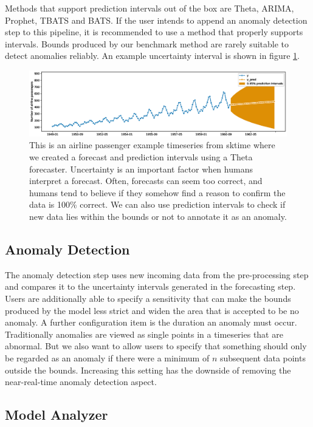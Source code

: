 Methods that support prediction intervals out of the box are Theta, ARIMA, Prophet, TBATS and BATS. If the user intends to append an anomaly detection step to this pipeline, it is recommended to use a method that properly supports intervals. Bounds produced by our benchmark method are rarely suitable to detect anomalies reliably. An example uncertainty interval is shown in figure \ref{fig:uncertainty}.


\begin{figure}
\centerline{\includegraphics[scale=.5]{Figures/uncertainty.eps}}
\caption{This is an airline passenger example timeseries from sktime where we created a forecast and prediction intervals using a Theta forecaster. Uncertainty is an important factor when humans interpret a forecast. Often, forecasts can seem too correct, and humans tend to believe if they somehow find a reason to confirm the data is 100\% correct. We can also use prediction intervals to check if new data lies within the bounds or not to annotate it as an anomaly.}
\label{fig:uncertainty}
\end{figure}

\subsection{Anomaly Detection}

The anomaly detection step uses new incoming data from the pre-processing step and compares it to the uncertainty intervals generated in the forecasting step. Users are additionally able to specify a sensitivity that can make the bounds produced by the model less strict and widen the area that is accepted to be no anomaly. A further configuration item is the duration an anomaly must occur. Traditionally anomalies are viewed as single points in a timeseries that are abnormal. But we also want to allow users to specify that something should only be regarded as an anomaly if there were a minimum of $n$ subsequent data points outside the bounds. Increasing this setting has the downside of removing the near-real-time anomaly detection aspect.

\subsection{Model Analyzer}

